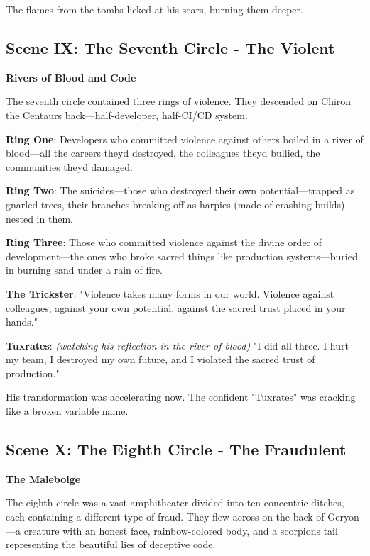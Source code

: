 The flames from the tombs licked at his scars, burning them deeper.

\bookdivider

\subsection{Scene IX: The Seventh Circle - The Violent}\label{scene-ix-the-seventh-circle---the-violent}

\textbf{Rivers of Blood and Code}

The seventh circle contained three rings of violence. They descended on Chiron the Centaur\textquotesingle s back---half-developer, half-CI/CD system.

\textbf{Ring One}: Developers who committed violence against others boiled in a river of blood---all the careers they\textquotesingle d destroyed, the colleagues they\textquotesingle d bullied, the communities they\textquotesingle d damaged.

\textbf{Ring Two}: The suicides---those who destroyed their own potential---trapped as gnarled trees, their branches breaking off as harpies (made of crashing builds) nested in them.

\textbf{Ring Three}: Those who committed violence against the divine order of development---the ones who broke sacred things like production systems---buried in burning sand under a rain of fire.

\textbf{The Trickster}: "Violence takes many forms in our world. Violence against colleagues, against your own potential, against the sacred trust placed in your hands."

\textbf{Tuxrates}: \emph{(watching his reflection in the river of blood)} "I did all three. I hurt my team, I destroyed my own future, and I violated the sacred trust of production."

His transformation was accelerating now. The confident "Tuxrates" was cracking like a broken variable name.

\bookdivider

\subsection{Scene X: The Eighth Circle - The Fraudulent}\label{scene-x-the-eighth-circle---the-fraudulent}

\textbf{The Malebolge}

The eighth circle was a vast amphitheater divided into ten concentric ditches, each containing a different type of fraud. They flew across on the back of Geryon---a creature with an honest face, rainbow-colored body, and a scorpion\textquotesingle s tail representing the beautiful lies of deceptive code.

